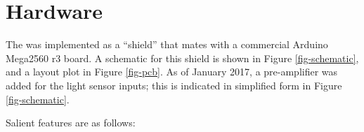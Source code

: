 %

\chapter{Hardware}
\label{sect-hardware}

The {\projectname} was implemented as a ``shield'' that mates with a 
commercial Arduino Mega2560 r3 board. A schematic for this shield is shown 
in Figure \ref{fig-schematic}, and a layout plot in Figure \ref{fig-pcb}. 
As of January 2017, a pre-amplifier was added for the light sensor inputs;
this is indicated in simplified form in Figure \ref{fig-schematic}.

Salient features are as follows:

